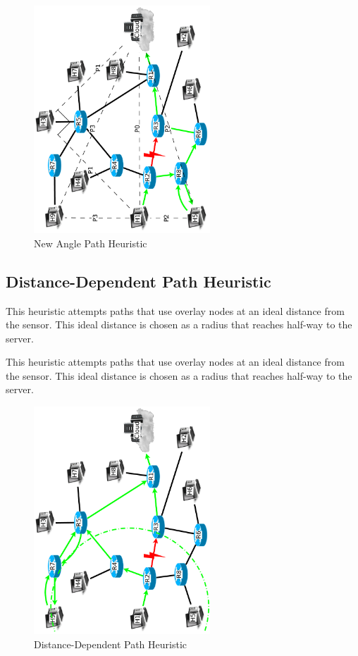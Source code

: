 \documentclass[conference]{IEEEtran}
\begin{document}
\begin{figure}[!H]
\centering
\includegraphics[width=2.6in,angle=-90]{../../images/diagrams/new_angle}
\caption{New Angle Path Heuristic}
\end{figure}

%
\subsection{Distance-Dependent Path Heuristic}
This heuristic attempts paths that use overlay nodes at an ideal distance from the sensor.  This ideal distance is chosen as a radius that reaches half-way to the server.
\begin{algorithm}
\DontPrintSemicolon
{}
\SetAlgoLined
\SetAlgoLongEnd
\scriptsize
\caption{This heuristic attempts paths that use overlay nodes at an ideal distance from the sensor.  This ideal distance is chosen as a radius that reaches half-way to the server.}
\small
\end{algorithm}

\begin{figure}[!H]
\centering
\includegraphics[width=2.6in,angle=-90]{../../images/diagrams/ideal_distant_path}
\caption{Distance-Dependent Path Heuristic}
\end{figure}
%
\end{document}
